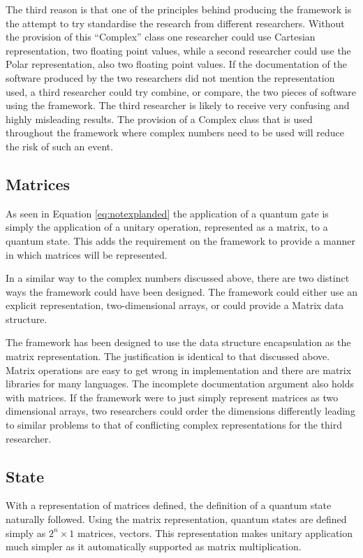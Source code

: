 \documentclass[authoryearcitations]{UoYCSproject}
\begin{document}
The third reason is that one of the principles behind producing the framework is the attempt to try standardise the research from different researchers.
Without the provision of this ``Complex'' class one researcher could use Cartesian representation, two floating point values, while a second researcher could use the Polar representation, also two floating point values.
If the documentation of the software produced by the two researchers did not mention the representation used, a third researcher could try combine, or compare, the two pieces of software using the framework.
The third researcher is likely to receive very confusing and highly misleading results.
The provision of a Complex class that is used throughout the framework where complex numbers need to be used will reduce the risk of such an event.

\subsection{Matrices}
As seen in Equation \ref{eq:notexplanded} the application of a quantum gate is simply the application of a unitary operation, represented as a matrix, to a quantum state.
This adds the requirement on the framework to provide a manner in which matrices will be represented.

In a similar way to the complex numbers discussed above, there are two distinct ways the framework could have been designed.
The framework could either use an explicit representation, two-dimensional arrays, or could provide a Matrix data structure.

The framework has been designed to use the data structure encapsulation as the matrix representation.
The justification is identical to that discussed above.
Matrix operations are easy to get wrong in implementation and there are matrix libraries for many languages.
The incomplete documentation argument also holds with matrices.
If the framework were to just simply represent matrices as two dimensional arrays, two researchers could order the dimensions differently leading to similar problems to that of conflicting complex representations for the third researcher.

\subsection{State}
With a representation of matrices defined, the definition of a quantum state naturally followed.
Using the matrix representation, quantum states are defined simply as $2^n\times1$ matrices, vectors.
This representation makes unitary application much simpler as it automatically supported as matrix multiplication.
\end{document}
